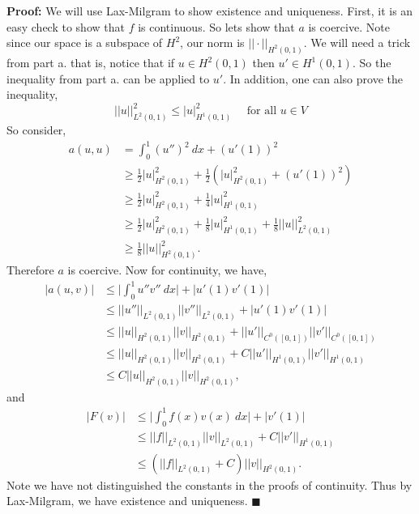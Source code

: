 \documentclass[11pt]{article}
\begin{document}
\textbf{Proof:} We will use Lax-Milgram to show existence and uniqueness. 
First, it is an easy check to show that $f$ is continuous.
So lets show that $a$ is coercive. 
Note since our space is a subspace of $H^2$, our norm is $||\cdot ||_{H^2(0,1)}$.
We will need a trick from part a. that is, notice that if $u \in H^2(0,1)$ then $u' \in H^1(0,1)$. 
So the inequality from part a. can be applied to $u'$.
In addition, one can also prove the inequality,
\begin{equation*}
    ||u||^2_{L^2(0,1)} \leq |u|^2_{H^1(0,1)} \quad \text{ for all } u \in V
\end{equation*}
So consider,
\begin{align*}
    a(u,u) &= \int_0^1 (u'')^2 \: dx + (u'(1))^2 \\
    &\geq \frac{1}{2} |u|^2_{H^2(0,1)} + \frac{1}{2}(|u|^2_{H^2(0,1)} + (u'(1))^2) \\ 
    &\geq \frac{1}{2}|u|^2_{H^2(0,1)} + \frac{1}{4} |u|^2_{H^1(0,1)} \\
    &\geq \frac{1}{2}|u|^2_{H^2(0,1)} + \frac{1}{8}|u|^2_{H^1(0,1)} + \frac{1}{8}||u||^2_{L^2(0,1)}  \\
    &\geq \frac{1}{8} ||u||^2_{H^2(0,1)}.
\end{align*}
Therefore $a$ is coercive. 
Now for continuity, we have,
\begin{align*}
	|a(u,v)| &\leq \Big|\int_0^1 u''v'' \: dx\Big| + |u'(1) v'(1)| \\
	&\leq ||u''||_{L^2(0,1)} ||v''||_{L^2(0,1)} + |u'(1) v'(1)| \\
	&\leq ||u||_{H^2(0,1)} ||v||_{H^2(0,1)} + ||u'||_{C^0([0,1])} ||v'||_{C^0([0,1])} \\
	&\leq ||u||_{H^2(0,1)} ||v||_{H^2(0,1)} + C||u'||_{H^1(0,1)} ||v'||_{H^1(0,1)} \\
	&\leq C||u||_{H^2(0,1)} ||v||_{H^2(0,1)},
\end{align*}
and 
\begin{align*}
	|F(v)| &\leq \Big| \int_0^1 f(x) v(x) \: dx \Big| + |v'(1)| \\
	&\leq ||f||_{L^2(0,1)} ||v||_{L^2(0,1)} + C||v'||_{H^1(0,1)} \\
	&\leq (||f||_{L^2(0,1)} + C)||v||_{H^2(0,1)}. 
\end{align*}
Note we have not distinguished the constants in the proofs of continuity.
Thus by Lax-Milgram, we have existence and uniqueness.
$\blacksquare$



\vskip 2cm
\end{document}
